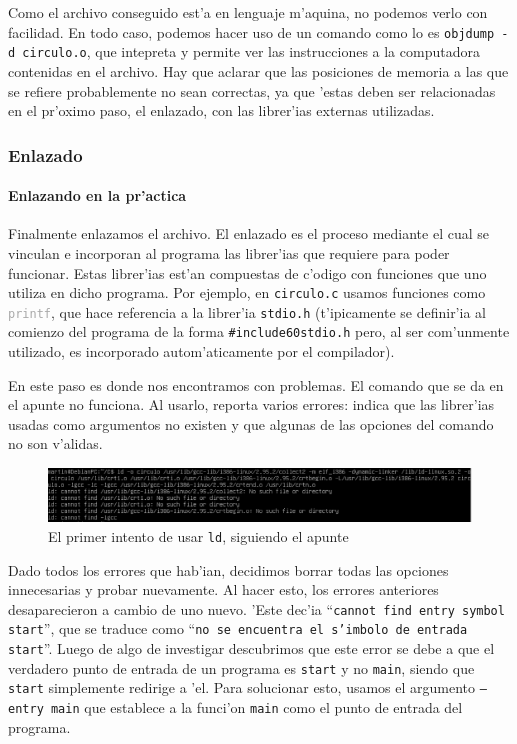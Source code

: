 \documentclass[11pt]{article}
\newcommand{\subsubsubsection}[1]{\paragraph{#1}\mbox{}}
\begin{document}
		Como el archivo conseguido est'a en lenguaje m'aquina, no podemos verlo con facilidad. En todo caso, podemos hacer uso de un comando como lo es \texttt{objdump -d circulo.o}, que intepreta y permite ver las instrucciones a la computadora contenidas en el archivo. Hay que aclarar que las posiciones de memoria a las que se refiere probablemente no sean correctas, ya que 'estas deben ser relacionadas en el pr'oximo paso, el enlazado, con las librer'ias externas utilizadas.
		
	\subsubsection{Enlazado}
	
		\subsubsubsection{Enlazando en la pr'actica}
	
		Finalmente enlazamos el archivo. El enlazado es el proceso mediante el cual se vinculan e incorporan al programa las librer'ias que requiere para poder funcionar. Estas librer'ias est'an compuestas de c'odigo con funciones que uno utiliza en dicho programa. Por ejemplo, en \texttt{circulo.c} usamos funciones como \texttt{\textcolor{darkgray}{printf}}, que hace referencia a la librer'ia \texttt{stdio.h} (t'ipicamente se definir'ia al comienzo del programa de la forma \texttt{\textcolor{fuchsia-vim}{\#include}\textcolor{orange-desert-vim}{\char60stdio.h}} pero, al ser com'unmente utilizado, es incorporado autom'aticamente por el compilador).
		
		En este paso es donde nos encontramos con problemas. El comando que se da en el apunte no funciona. Al usarlo, reporta varios errores: indica que las librer'ias usadas como argumentos no existen y que algunas de las opciones del comando no son v'alidas.
	
		\begin{figure}[H]
			\centering
			\includegraphics[width=.9\linewidth]{Images/Seccion 1/S1 parte cinco}
			\caption{El primer intento de usar \texttt{ld}, siguiendo el apunte}
			\label{fig:first-ld-attempt}
		\end{figure}
		
		Dado todos los errores que hab'ian, decidimos borrar todas las opciones innecesarias y probar nuevamente. Al hacer esto, los errores anteriores desaparecieron a cambio de uno nuevo. 'Este dec'ia ``\texttt{cannot find entry symbol \textunderscore\/start}'', que se traduce como ``\texttt{no se encuentra el s'imbolo de entrada \textunderscore\/start}''. Luego de algo de investigar descubrimos que este error se debe a que el verdadero punto de entrada\footnotemark\/ de un programa es \texttt{\textunderscore\/start} y no \texttt{main}, siendo que \texttt{\textunderscore\/start} simplemente redirige a 'el. Para solucionar esto, usamos el argumento \texttt{--entry main} que establece a la funci'on \texttt{main} como el punto de entrada del programa.
		
\end{document}
